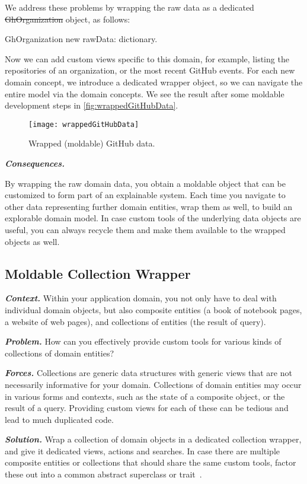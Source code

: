 \documentclass[acmsmall,screen,authorversion,nonacm]{acmart} %
\newcommand{\pattern}[2]{\subsection*{#1}\label{pat:#2}}
\newcommand{\patsec}[1]{\noindent\textit{\textbf{#1.}}\xspace}
\begin{document}
We address these problems by wrapping the raw data as a dedicated \st{GhOrganization} object, as follows:

\begin{code}
GhOrganization new rawData: dictionary.
\end{code}

Now we can add custom views specific to this domain, for example, listing the repositories of an organization, or the most recent GitHub events.
For each new domain concept, we introduce a dedicated wrapper object, so we can navigate the entire model via the domain concepts.
We see the result after some moldable development steps in \autoref{fig:wrappedGitHubData}.

\begin{figure}[h]
  \texttt{[image: wrappedGitHubData]}
  \caption{Wrapped (moldable) GitHub data.}
  \label{fig:wrappedGitHubData}
\end{figure}

\patsec{Consequences}

By wrapping the raw domain data, you obtain a moldable object that can be customized to form part of an explainable system.
Each time you navigate to other data representing further domain entities, wrap them as well, to build an explorable domain model.
In case custom tools of the underlying data objects are useful, you can always recycle them and make them available to the wrapped objects as well.

\pattern{Moldable Collection Wrapper}{collectionWrapper}

\patsec{Context}
Within your application domain, you not only have to deal with individual domain objects, but also composite entities (\eg a book of notebook pages, a website of web pages), and collections of entities (\eg the result of query).

\patsec{Problem}
How can you effectively provide custom tools for various kinds of collections of domain entities?

\patsec{Forces}
Collections are generic data structures with generic views that are not necessarily informative for your domain.
Collections of domain entities may occur in various forms and contexts, such as the state of a composite object, or the result of a query.
Providing custom views for each of these can be tedious and lead to much duplicated code.

\patsec{Solution}
Wrap a collection of domain objects in a dedicated collection wrapper, and give it dedicated views, actions and searches.
In case there are multiple composite entities or collections that should share the same custom tools, factor these out into a common abstract superclass or trait~\cite{Duca06b}.
\end{document}
